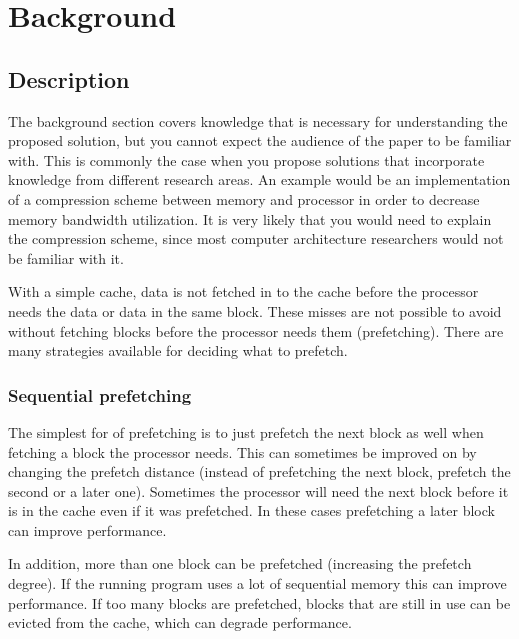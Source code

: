 \section{Background}
\subsection{Description}
The background section covers knowledge that is necessary
for understanding the proposed solution, but you cannot expect
the audience of the paper to be familiar with. This is commonly
the case when you propose solutions that incorporate
knowledge from different research areas. An example would
be an implementation of a compression scheme between
memory and processor in order to decrease memory bandwidth
utilization. It is very likely that you would need to explain
the compression scheme, since most computer architecture
researchers would not be familiar with it.


With a simple cache, data is not fetched in to the cache before the
processor needs the data or data in the same block. These misses
are not possible to avoid without fetching blocks before the
processor needs them (prefetching). There are many strategies
available for deciding what to prefetch.

\subsubsection{Sequential prefetching}

The simplest for of prefetching is to just prefetch the next block
as well when fetching a block the processor needs. This can
sometimes be improved on by changing the prefetch distance (instead
of prefetching the next block, prefetch the second or a later one).
Sometimes the processor will need the next block before it is in
the cache even if it was prefetched. In these cases prefetching a
later block can improve performance.

In addition, more than one block can be prefetched (increasing the
prefetch degree). If the running program uses a lot of sequential
memory this can improve performance. If too many blocks are
prefetched, blocks that are still in use can be evicted from the
cache, which can degrade performance.

